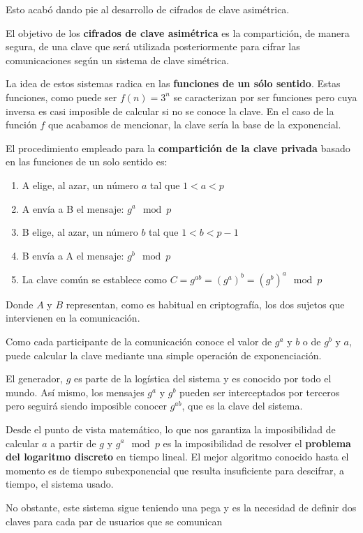 \documentclass[nochap]{apuntesURJC}
\begin{document}
Esto acabó dando pie al desarrollo de cifrados de clave asimétrica.

El objetivo de los \textbf{cifrados de clave asimétrica} es la compartición, de manera segura, de una clave que será utilizada posteriormente para cifrar las comunicaciones según un sistema de clave simétrica.

La idea de estos sistemas radica en las \textbf{funciones de un sólo sentido}. Estas funciones, como puede ser $f(n)=3^n$ se caracterizan por ser funciones  pero cuya inversa es casi imposible de calcular si no se conoce la clave. En el caso de la función $f$ que acabamos de mencionar, la clave sería la base de la exponencial.

El procedimiento empleado para la \textbf{compartición de la clave privada} basado en las funciones de un solo sentido es:

\begin{enumerate}
\item A elige, al azar, un número $a$ tal que $1<a<p$
\item A envía a B el mensaje: $g^a \mod p$
\item B elige, al azar, un número $b$ tal que $1<b<p-1$
\item B envía a A el mensaje: $g^b \mod p$
\item La clave común se establece como $C=g^{ab}=(g^a)^b = (g^b)^a \mod p$
\end{enumerate}

Donde $A$ y $B$ representan, como es habitual en criptografía, los dos sujetos que intervienen en la comunicación.

Como cada participante de la comunicación conoce el valor de $g^a$ y $b$ o de $g^b$ y $a$, puede calcular la clave mediante una simple operación de exponenciación.

El generador, $g$ es parte de la logística del sistema y es conocido por todo el mundo. Así mismo, los mensajes $g^a$ y $g^b$ pueden ser interceptados por terceros pero seguirá siendo imposible conocer $g^{ab}$, que es la clave del sistema.

Desde el punto de vista matemático, lo que nos garantiza la imposibilidad de calcular $a$ a partir de $g$ y $g^a \mod p$ es la imposibilidad de resolver el \textbf{problema del logaritmo discreto} en tiempo lineal. El mejor algoritmo conocido hasta el momento es de tiempo subexponencial que resulta insuficiente para descifrar, a tiempo, el sistema usado.

No obstante, este sistema sigue teniendo una pega y es la necesidad de definir dos claves para cada par de usuarios que se comunican
\end{document}
